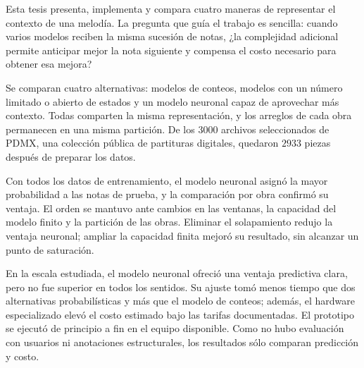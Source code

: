 Esta tesis presenta, implementa y compara cuatro maneras de representar el contexto de una melodía. La pregunta que guía el trabajo es sencilla: cuando varios modelos reciben la misma sucesión de notas, ¿la complejidad adicional permite anticipar mejor la nota siguiente y compensa el costo necesario para obtener esa mejora?

Se comparan cuatro alternativas: modelos de conteos, modelos con un número limitado o abierto de estados y un modelo neuronal capaz de aprovechar más contexto. Todas comparten la misma representación, y los arreglos de cada obra permanecen en una misma partición. De los $3000$ archivos seleccionados de PDMX, una colección pública de partituras digitales, quedaron $2933$ piezas después de preparar los datos.

Con todos los datos de entrenamiento, el modelo neuronal asignó la mayor probabilidad a las notas de prueba, y la comparación por obra confirmó su ventaja. El orden se mantuvo ante cambios en las ventanas, la capacidad del modelo finito y la partición de las obras. Eliminar el solapamiento redujo la ventaja neuronal; ampliar la capacidad finita mejoró su resultado, sin alcanzar un punto de saturación.

En la escala estudiada, el modelo neuronal ofreció una ventaja predictiva clara, pero no fue superior en todos los sentidos. Su ajuste tomó menos tiempo que dos alternativas probabilísticas y más que el modelo de conteos; además, el hardware especializado elevó el costo estimado bajo las tarifas documentadas. El prototipo se ejecutó de principio a fin en el equipo disponible. Como no hubo evaluación con usuarios ni anotaciones estructurales, los resultados sólo comparan predicción y costo.
